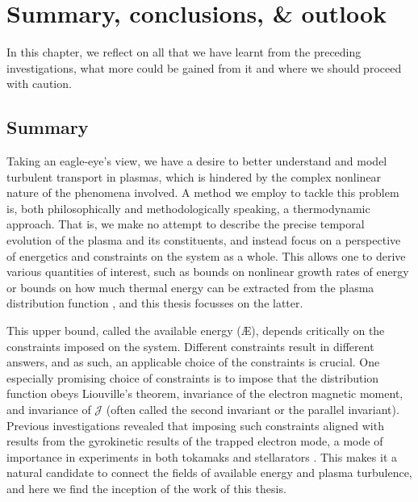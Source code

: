 \chapter{Summary, conclusions, \& outlook}
\vspace*{3mm}
In this chapter, we reflect on all that we have learnt from the preceding investigations, what more could be gained from it and where we should proceed with caution. 
\section{Summary}
Taking an eagle-eye's view, we have a desire to better understand and model turbulent transport in plasmas, which is hindered by the complex nonlinear nature of the phenomena involved. A method we employ to tackle this problem is, both philosophically and methodologically speaking, a thermodynamic approach. That is, we make no attempt to describe the precise temporal evolution of the plasma and its constituents, and instead focus on a perspective of energetics and constraints on the system as a whole. This allows one to derive various quantities of interest, such as bounds on nonlinear growth rates of energy \cite{helander2022energetic,plunk2022energetic,plunk2023energetic} or bounds on how much thermal energy can be extracted from the plasma distribution function \cite{gardner1963bound,helander2017available,kolmes2020recovering,helander2020available}, and this thesis focusses on the latter. \par 
This upper bound, called the available energy (\AE{}), depends critically on the constraints imposed on the system. Different constraints result in different answers, and as such, an applicable choice of the constraints is crucial. One especially promising choice of constraints is to impose that the distribution function obeys Liouville's theorem, invariance of the electron magnetic moment, and invariance of $\mathcal{J}$ (often called the second invariant or the parallel invariant). Previous investigations revealed that imposing such constraints aligned with results from the gyrokinetic results of the trapped electron mode, a mode of importance in experiments in both tokamaks and stellarators \cite{rewoldt2005comparison,guttenfelder2008effect,fable2009role}. This makes it a natural candidate to connect the fields of available energy and plasma turbulence, and here we find the inception of the work of this thesis. \par 
